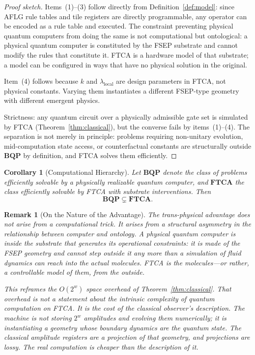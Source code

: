 \documentclass[11pt,letterpaper]{article}
\newtheorem{corollary}{Corollary}[theorem]
\newtheorem{remark}{Remark}
\begin{document}
\begin{proof}[Proof sketch]
Items~(1)--(3) follow directly from Definition~\ref{def:model}: since AFLG rule tables and tile registers are directly programmable, any operator can be encoded as a rule table and executed. The constraint preventing physical quantum computers from doing the same is not computational but ontological: a physical quantum computer is constituted by the FSEP substrate and cannot modify the rules that constitute it. FTCA is a hardware model of that substrate; a model can be configured in ways that have no physical solution in the original.

Item~(4) follows because $k$ and $\lambda_{\text{local}}$ are design parameters in FTCA, not physical constants. Varying them instantiates a different FSEP-type geometry with different emergent physics.

Strictness: any quantum circuit over a physically admissible gate set is simulated by FTCA (Theorem~\ref{thm:classical}), but the converse fails by items~(1)--(4). The separation is not merely in principle: problems requiring non-unitary evolution, mid-computation state access, or counterfactual constants are structurally outside $\mathbf{BQP}$ by definition, and FTCA solves them efficiently.
\end{proof}

\begin{corollary}[Computational Hierarchy]
\label{cor:hierarchy}
Let $\mathbf{BQP}$ denote the class of problems efficiently solvable by a physically realizable quantum computer, and $\mathbf{FTCA}$ the class efficiently solvable by FTCA with substrate interventions. Then
\[
\mathbf{BQP} \subsetneq \mathbf{FTCA}.
\]
\end{corollary}

\begin{remark}[On the Nature of the Advantage]
The trans-physical advantage does not arise from a computational trick. It arises from a structural asymmetry in the relationship between computer and ontology. A physical quantum computer is \emph{inside} the substrate that generates its operational constraints: it is made of the FSEP geometry and cannot step outside it any more than a simulation of fluid dynamics can reach into the actual molecules. FTCA is the molecules---or rather, a controllable model of them, from the outside.

This reframes the $O(2^w)$ space overhead of Theorem~\ref{thm:classical}. That overhead is not a statement about the intrinsic complexity of quantum computation on FTCA. It is the cost of the classical observer's description. The machine is not storing $2^w$ amplitudes and evolving them numerically; it is instantiating a geometry whose boundary dynamics \emph{are} the quantum state. The classical amplitude registers are a projection of that geometry, and projections are lossy. The real computation is cheaper than the description of it.
\end{remark}
\end{document}
